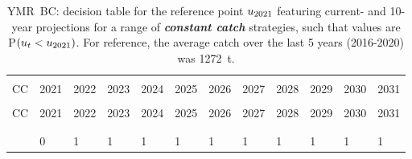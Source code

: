 \documentclass[11pt]{book}
\newcommand{\itbf}[1]{\textit{\textbf{#1}}}
\begin{document}
\begin{longtable}[c]{>{\raggedright\let\newline\\\arraybackslash\hspace{0pt}}p{0.48in}>{\raggedleft\let\newline\\\arraybackslash\hspace{0pt}}p{0.48in}>{\raggedleft\let\newline\\\arraybackslash\hspace{0pt}}p{0.48in}>{\raggedleft\let\newline\\\arraybackslash\hspace{0pt}}p{0.48in}>{\raggedleft\let\newline\\\arraybackslash\hspace{0pt}}p{0.51in}>{\raggedleft\let\newline\\\arraybackslash\hspace{0pt}}p{0.51in}>{\raggedleft\let\newline\\\arraybackslash\hspace{0pt}}p{0.51in}>{\raggedleft\let\newline\\\arraybackslash\hspace{0pt}}p{0.51in}>{\raggedleft\let\newline\\\arraybackslash\hspace{0pt}}p{0.51in}>{\raggedleft\let\newline\\\arraybackslash\hspace{0pt}}p{0.51in}>{\raggedleft\let\newline\\\arraybackslash\hspace{0pt}}p{0.51in}>{\raggedleft\let\newline\\\arraybackslash\hspace{0pt}}p{0.51in}}
  \caption{YMR~BC: decision table for the reference point $u_{2021}$ featuring current- and 10-year projections for a range of \itbf{constant catch} strategies, such that values are P$(u_t < u_{2021})$.  For reference, the average catch over the last 5 years (2016-2020) was 1272~t. } \label{tab:ymr.gmu.ucurr.CCs}\\  \hline\\[-2.2ex]  CC  & 2021 & 2022 & 2023 & 2024 & 2025 & 2026 & 2027 & 2028 & 2029 & 2030 & 2031 \\[0.2ex]\hline\\[-1.5ex]  \endfirsthead   \hline  CC  & 2021 & 2022 & 2023 & 2024 & 2025 & 2026 & 2027 & 2028 & 2029 & 2030 & 2031 \\[0.2ex]\hline\\[-1.5ex]  \endhead  \hline\\[-2.2ex]   \endfoot  \hline \endlastfoot  0 & 0 & 1 & 1 & 1 & 1 & 1 & 1 & 1 & 1 & 1 & 1 \\ 

\end{longtable}
\end{document}

